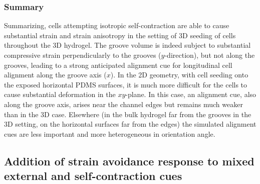 \documentclass[11pt]{amsart}
\begin{document}
\subsubsection{Summary}

Summarizing, cells attempting isotropic self-contraction are able to cause substantial strain and strain anisotropy in the setting of 3D seeding of cells throughout the 3D hydrogel. The groove volume is indeed subject to substantial compressive strain perpendicularly to the grooves ($y$-direction), but not along the grooves, leading to a strong anticipated alignment cue for longitudinal cell alignment along the groove axis ($x$). In the 2D geometry, with cell seeding onto the exposed horizontal PDMS surfaces, it is much more difficult for the cells to cause substantial deformation in the $xy$-plane. In this case, an alignment cue, also along the groove axis, arises near the channel edges but remains much weaker than in the 3D case. Elsewhere (in the bulk hydrogel far from the grooves in the 3D setting, on the horizontal surfaces far from the edges) the simulated alignment cues are less important and more heterogeneous in orientation angle.


\subsection{Addition of strain avoidance response to mixed external and self-contraction cues}

\begin{figure}
\end{figure}
\end{document}
